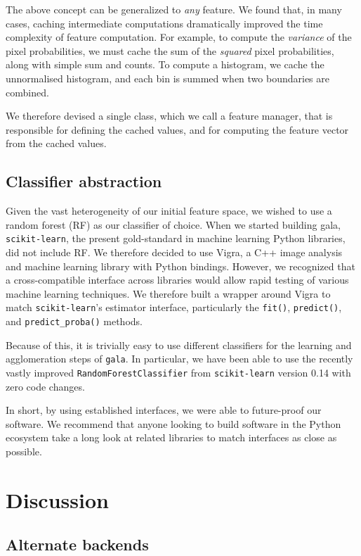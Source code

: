 \documentclass{frontiersSCNS} %
\begin{document}
The above concept can be generalized to \emph{any} feature.
We found that, in many cases, caching intermediate computations dramatically improved the time complexity of feature computation.
For example, to compute the \emph{variance} of the pixel probabilities, we must cache the sum of the \emph{squared} pixel probabilities, along with simple sum and counts.
To compute a histogram, we cache the unnormalised histogram, and each bin is summed when two boundaries are combined.

We therefore devised a single class, which we call a feature manager, that is responsible for defining the cached values, and for computing the feature vector from the cached values.


\subsection{Classifier abstraction}

Given the vast heterogeneity of our initial feature space, we wished to use a random forest (RF) as our classifier of choice.
When we started building gala, \texttt{scikit-learn}, the present gold-standard in machine learning Python libraries, did not include RF.
We therefore decided to use Vigra, a C++ image analysis and machine learning library with Python bindings.
However, we recognized that a cross-compatible interface across libraries would allow rapid testing of various machine learning techniques.
We therefore built a wrapper around Vigra to match \texttt{scikit-learn}'s estimator interface, particularly the \texttt{fit()}, \texttt{predict()}, and \texttt{predict\_proba()} methods.

Because of this, it is trivially easy to use different classifiers for the learning and agglomeration steps of \texttt{gala}.
In particular, we have been able to use the recently vastly improved \texttt{RandomForestClassifier} from \texttt{scikit-learn} version 0.14 with zero code changes.

In short, by using established interfaces, we were able to future-proof our software.
We recommend that anyone looking to build software in the Python ecosystem take a long look at related libraries to match interfaces as close as possible.


\section{Discussion}


\subsection{Alternate backends}
\end{document}
